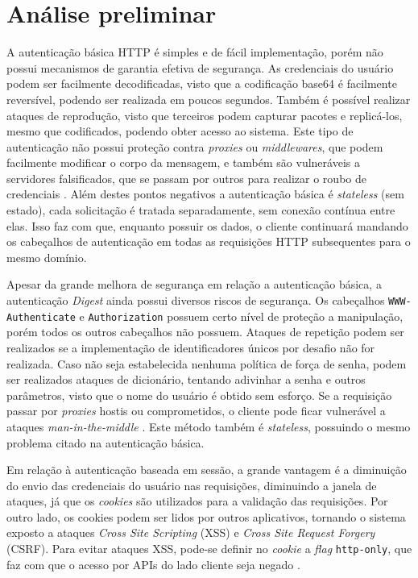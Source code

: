 \section{Análise preliminar}

A autenticação básica HTTP é simples e de fácil implementação, porém não possui mecanismos de 
garantia efetiva de segurança. As credenciais do usuário podem ser facilmente decodificadas, visto 
que a codificação base64 é facilmente reversível, podendo ser realizada em poucos segundos. Também 
é possível realizar ataques de reprodução, visto que terceiros podem capturar pacotes e replicá-los, 
mesmo que codificados, podendo obter acesso ao sistema. Este tipo de autenticação não possui proteção 
contra \emph{proxies} ou \emph{middlewares}, que podem facilmente modificar o corpo da mensagem, e 
também são vulneráveis a servidores falsificados, que se passam por outros para realizar o roubo de 
credenciais \cite{GOURLEY2002}. Além destes pontos negativos a autenticação básica é 
\emph{stateless} (sem estado), cada solicitação é tratada separadamente, sem conexão contínua entre 
elas. Isso faz com que, enquanto possuir os dados, o cliente continuará mandando os cabeçalhos de 
autenticação em todas as requisições HTTP subsequentes para o mesmo domínio.

Apesar da grande melhora de segurança em relação a autenticação básica, a autenticação 
\emph{Digest} ainda possui diversos riscos de segurança. Os cabeçalhos 
\texttt{WWW-Authenticate} e \texttt{Authorization} possuem certo nível de proteção a manipulação, 
porém todos os outros cabeçalhos não possuem. Ataques de repetição podem ser realizados se a implementação de 
identificadores únicos por desafio não for realizada. Caso não seja estabelecida nenhuma política de 
força de senha, podem ser realizados ataques de dicionário, tentando adivinhar a senha e outros 
parâmetros, visto que o nome do usuário é obtido sem esforço. Se a requisição passar por 
\emph{proxies} hostis ou comprometidos, o cliente pode ficar vulnerável a ataques 
\emph{man-in-the-middle} \cite{GOURLEY2002}. Este método também é \emph{stateless}, possuindo o 
mesmo problema citado na autenticação básica.

Em relação à autenticação baseada em sessão, a grande vantagem é a diminuição do envio das 
credenciais do usuário nas requisições, diminuindo a janela de ataques, já que os \emph{cookies} 
são utilizados para a validação das requisições. Por outro lado, os cookies podem ser lidos por 
outros aplicativos, tornando o sistema exposto a ataques \emph{Cross Site Scripting} (XSS) e 
\emph{Cross Site Request Forgery} (CSRF). Para evitar ataques XSS, pode-se definir no \emph{cookie} 
a \emph{flag} \texttt{http-only}, que faz com que o acesso por APIs do lado cliente seja negado 
\cite{PAPATHANASAKI2022}.

